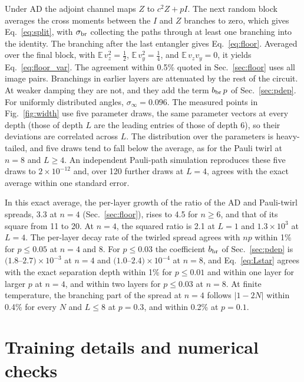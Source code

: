 \documentclass[
 aps,pra,
 twocolumn,
 superscriptaddress,
 longbibliography,
 nofootinbib
]{revtex4-2}
\begin{document}
Under AD the adjoint channel maps $Z$ to $c^2Z+pI$. The next random block
averages the cross moments between the $I$ and $Z$ branches to zero, which
gives Eq.~\eqref{eq:split}, with $\sigma_{\rm br}$ collecting the paths through
at least one branching into the identity. The
branching after the last entangler gives Eq.~\eqref{eq:floor}. Averaged over
the final block, with $\mathbb E\,v_z^2=\frac12$, $\mathbb E\,v_y^2=\frac14$, and
$\mathbb E\,v_zv_y=0$, it yields Eq.~\eqref{eq:floor_var}. The agreement
within 0.5\% quoted in Sec.~\ref{sec:floor} uses all image pairs.
Branchings in earlier layers are attenuated by the rest of the circuit. At
weaker damping they are not, and they add the term $b_{\rm br}\,p$ of
Sec.~\ref{sec:pdep}. For uniformly
distributed angles, $\sigma_\infty=0.096$. The measured points in
Fig.~\ref{fig:width} use five parameter draws, the same parameter vectors at
every depth (those of depth $L$ are the leading entries of those of depth 6),
so their deviations are correlated across $L$. The distribution over the
parameters is heavy-tailed, and five draws tend to fall below the average, as
for the Pauli twirl at $n=8$ and $L\ge4$. An independent Pauli-path simulation
reproduces these five draws to $2\times10^{-12}$ and, over 120 further draws
at $L=4$, agrees with the exact average within one standard error.

In this exact average, the per-layer growth of the ratio of the AD and
Pauli-twirl spreads, 3.3 at $n=4$ (Sec.~\ref{sec:floor}), rises to 4.5 for
$n\ge6$, and that of its square from 11 to 20. At $n=4$, the squared ratio is
2.1 at $L=1$ and $1.3\times10^3$ at $L=4$. The per-layer decay rate of the
twirled spread agrees with $np$ within 1\% for $p\le0.05$ at $n=4$ and 8. For
$p\le0.03$ the coefficient $b_{\rm br}$ of Sec.~\ref{sec:pdep} is
$(1.8$--$2.7)\times10^{-3}$ at $n=4$ and $(1.0$--$2.4)\times10^{-4}$ at $n=8$, and
Eq.~\eqref{eq:Lstar} agrees with the exact separation depth within 1\% for
$p\le0.01$ and within one layer for larger $p$ at $n=4$, and within two layers
for $p\le0.03$ at $n=8$. At finite temperature, the branching part of the
spread at $n=4$ follows $\lvert1-2N\rvert$ within 0.4\% for every $N$ and
$L\le8$ at $p=0.3$, and within 0.2\% at $p=0.1$.

\section{Training details and numerical checks}
\label{app:training}
\end{document}
